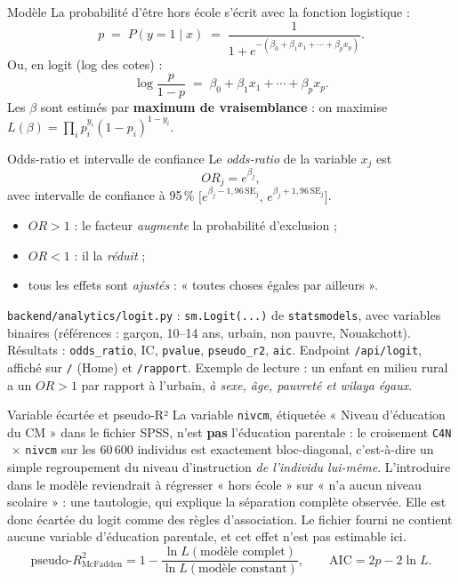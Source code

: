 \documentclass[11pt,a4paper]{article}
\newcommand{\txt}[1]{\texttt{#1}}
\begin{document}
\begin{meth}{Modèle}
La probabilité d'être hors école s'écrit avec la fonction logistique :
\[
p \;=\; P(y=1\mid x) \;=\; \frac{1}{1+e^{-(\beta_0 + \beta_1 x_1 + \cdots + \beta_p x_p)}}.
\]
Ou, en logit (log des cotes) :
\[
\log\frac{p}{1-p} \;=\; \beta_0 + \beta_1 x_1 + \cdots + \beta_p x_p.
\]
Les $\beta$ sont estimés par \textbf{maximum de vraisemblance} : on maximise
$L(\beta)=\prod_i p_i^{y_i}(1-p_i)^{1-y_i}$.
\end{meth}

\begin{meth}{Odds-ratio et intervalle de confiance}
Le \emph{odds-ratio} de la variable $x_j$ est
\[
OR_j = e^{\beta_j},
\]
avec intervalle de confiance à 95\,\% $\big[e^{\beta_j - 1{,}96\,\mathrm{SE}_j},\,
e^{\beta_j + 1{,}96\,\mathrm{SE}_j}\big]$.
\begin{itemize}[leftmargin=2em]
  \item $OR>1$ : le facteur \emph{augmente} la probabilité d'exclusion ;
  \item $OR<1$ : il la \emph{réduit} ;
  \item tous les effets sont \emph{ajustés} : « toutes choses égales par ailleurs ».
\end{itemize}
\end{meth}

\begin{where}
\txt{backend/analytics/logit.py} : \txt{sm.Logit(...)} de
\texttt{statsmodels}, avec variables binaires (références : garçon,
10--14 ans, urbain, non pauvre, Nouakchott). Résultats : \txt{odds\_ratio},
IC, \txt{pvalue}, \txt{pseudo\_r2}, \txt{aic}. Endpoint \txt{/api/logit},
affiché sur \txt{/} (Home) et \txt{/rapport}. Exemple de lecture : un enfant en milieu rural a
un $OR>1$ par rapport à l'urbain, \emph{à sexe, âge, pauvreté et wilaya
égaux}.
\end{where}

\begin{meth}{Variable écartée et pseudo-R²}
La variable \txt{nivcm}, étiquetée « Niveau d'éducation du CM » dans le
fichier SPSS, n'est \textbf{pas} l'éducation parentale : le croisement
\txt{C4N}$\,\times\,$\txt{nivcm} sur les 60\,600 individus est exactement
bloc-diagonal, c'est-à-dire un simple regroupement du niveau d'instruction
\emph{de l'individu lui-même}. L'introduire dans le modèle reviendrait à
régresser « hors école » sur « n'a aucun niveau scolaire » : une tautologie,
qui explique la séparation complète observée. Elle est donc écartée du logit
comme des règles d'association. Le fichier fourni ne contient aucune variable
d'éducation parentale, et cet effet n'est pas estimable ici.
\[
\text{pseudo-}R^2_{\text{McFadden}} = 1 - \frac{\ln L(\text{modèle complet})}
{\ln L(\text{modèle constant})}, \qquad
\text{AIC} = 2p - 2\ln L.
\]
\end{meth}
\end{document}
